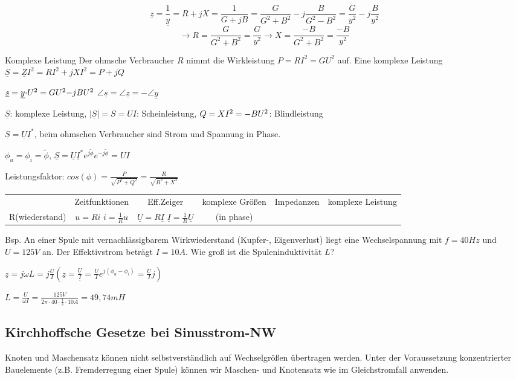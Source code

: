 \documentclass[german]{article}
\begin{document}
\[ \underline{z} = \frac1{\underline{y}} = R + jX = \frac1{G + jB} = \frac{G}{G^2 + B^2} - j\frac{B}{G^2 - B^2} = \frac{G}{y^2} - j \frac{B}{y^2}\]
\[ \rightarrow R = \frac{G}{G^2 + B^2} = \frac{G}{y^2} \rightarrow X = \frac{-B}{G^2 + B^2} = \frac{-B}{y^2} \]

Komplexe Leistung
Der ohmsche Verbraucher $R$ nimmt die Wirkleistung $P = RI^2 = GU^2$ auf. Eine komplexe Leistung $\underline{S} = \underline{Z}I^2 = RI^2 + jXI^2 = P + jQ$

$\underline{s} = \underline{y} {\it \cdot} U^2 = GU^2 {\it -} jBU^2$ \hspace{10pt} $\angle \underline{s} = \angle \underline{z} = - \angle \underline{y}$

$\underline{S}$: komplexe Leistung, $|\underline{S}| = S = UI$: Scheinleistung, $Q = XI^2 = {\it -} BU^2$: Blindleistung

$\underline{S} = \underline{U} \underline{I}^*$, beim ohmschen Verbraucher sind Strom und Spannung in Phase.

$\phi_u = \phi_i = \tilde\phi$, $\underline{S} = \underline{U} \underline{I}^* e^{j\tilde\phi} e^{-j\tilde\phi} = UI$


Leistungsfaktor: $cos(\phi) = \frac{P}{\sqrt{P^2 + Q^2}} = \frac{R}{\sqrt{R^2 + X^2}}$

\begin{tabular}{cccccc}
	 & Zeitfunktionen & Eff.Zeiger & komplexe Größen & Impedanzen & komplexe Leistung \\
	R(wiederstand) & $u = Ri$ $i = \frac1R u$ & $\underline{U} = R\underline{I}$ $\underline{I} = \frac1R \underline{U}$ & (in phase) & 
\end{tabular}

Bsp. An einer Spule mit vernachlässigbarem Wirkwiederstand (Kupfer-, Eigenverlust) liegt eine Wechselspannung mit $f = 40Hz$ und $U = 125V$ an. Der Effektivstrom beträgt $I = 10A$. Wie groß ist die Spuleninduktivität $L$?

$\underline{z} = j\omega L = j \frac{U}{I} (\underline{z} = \frac{\underline{U}}{\underline{I}} = \frac{U}{I} e^{j(\phi_u - \phi_i)} = \frac{U}{I} j )$

$L = \frac{U}{\omega I} = \frac{125V}{2 \pi \cdot 40 \cdot \frac1s \cdot 10A} = 49,74mH$


\subsection{Kirchhoffsche Gesetze bei Sinusstrom-NW}
Knoten und Maschensatz können nicht selbstverständlich auf Wechselgrößen übertragen werden. Unter der Voraussetzung konzentrierter Bauelemente (z.B. Fremderregung einer Spule) können wir Maschen- und Knotensatz wie im Gleichstromfall anwenden.
\end{document}
